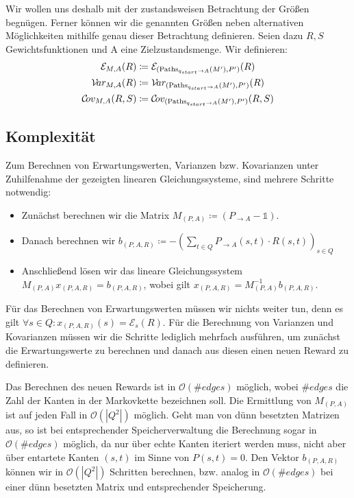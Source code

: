 \documentclass[a4paper]{article}
\theoremstyle{nonumberplain}
\begin{document}
Wir wollen uns deshalb mit der zustandsweisen Betrachtung der Größen begnügen. Ferner können wir die genannten Größen neben alternativen Mög\-lich\-keit\-en mithilfe genau dieser Betrachtung definieren. Seien dazu $R, S$ Gewichtsfunktionen und A eine Zielzustandsmenge. Wir definieren:
\begin{align*}
\mathcal{E}_{M,A}(R) \coloneqq \;& \mathcal{E}_{(\mathrm{Paths}_{q_{start} \rightarrow A}(M'), P')}(R) \\
\mathcal{V}\!ar_{M,A}(R) \coloneqq \;& \mathcal{V}\!ar_{(\mathrm{Paths}_{q_{start} \rightarrow A}(M'), P')}(R) \\
\mathcal{C}\!ov_{M,A}(R,S) \coloneqq \;& \mathcal{C}\!ov_{(\mathrm{Paths}_{q_{start} \rightarrow A}(M'), P')}(R,S) \\
\end{align*}
	
\subsection{Komplexität}

Zum Berechnen von Erwartungswerten, Varianzen bzw. Kovarianzen unter Zuhilfenahme der gezeigten linearen Gleichungssysteme, sind mehrere Schritte notwendig:

\begin{itemize}
	\item Zunächst berechnen wir die Matrix $M_{(P,A)} \coloneqq (P_{\rightarrow A} - \mathbb{1})$.
	\item Danach berechnen wir $b_{(P,A,R)} \coloneqq - \left(\sum_{t \in Q}{ P_{\rightarrow A}(s,t) \cdot R(s,t) }\right)_{s \in Q}$
	\item Anschließend lösen wir das lineare Gleichungssystem $M_{(P,A)}x_{(P,A,R)} = b_{(P,A,R)}$, wobei gilt $x_{(P,A,R)} = M_{(P,A)}^{-1}b_{(P,A,R)}$.
\end{itemize}

Für das Berechnen von Erwartungswerten müssen wir nichts weiter tun, denn es gilt $\forall s\in Q : x_{(P,A,R)}(s) = \mathcal{E}_s(R)$.
Für die Berechnung von Varianzen und Kovarianzen müssen wir die Schritte lediglich mehrfach ausführen, um zunächst die Erwartungswerte zu berechnen und danach aus diesen einen neuen Reward zu definieren.

Das Berechnen des neuen Rewards ist in $\mathcal{O}(\#edges)$ möglich, wobei $\#edges$ die Zahl der Kanten in der Markovkette bezeichnen soll. Die Ermittlung von $M_{(P,A)}$ ist auf jeden Fall in $\mathcal{O}(|Q^2|)$ möglich. Geht man von dünn besetzten Matrizen aus, so ist bei entsprechender Speicherverwaltung die Berechnung sogar in $\mathcal{O}(\#edges)$ möglich, da nur über echte Kanten iteriert werden muss, nicht aber über entartete Kanten $(s,t)$ im Sinne von $P(s,t) = 0$. Den Vektor $b_{(P,A,R)}$ können wir in $\mathcal{O}(|Q^2|)$ Schritten berechnen, bzw. analog in $\mathcal{O}(\#edges)$ bei einer dünn besetzten Matrix und entsprechender Speicherung.
\end{document}
